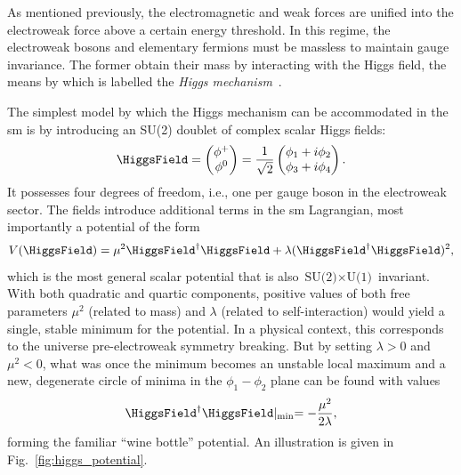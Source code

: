 As mentioned previously, the electromagnetic and weak forces are unified into the electroweak force above a certain energy threshold. In this regime, the electroweak bosons and elementary fermions must be massless to maintain gauge invariance. The former obtain their mass by interacting with the Higgs field, the means by which is labelled the \emph{Higgs mechanism}~\cite{PhysRevLett.13.321,PhysRevLett.13.508,PhysRevLett.13.585}.

The simplest model by which the Higgs mechanism can be accommodated in the \acrshort{sm} is by introducing an SU(2) doublet of complex scalar Higgs fields:
\begin{equation} %
    \HiggsField = \begin{pmatrix} \phi^+ \\ \phi^0 \end{pmatrix} = \frac{1}{\sqrt{2}} \begin{pmatrix} \phi_1 + i\phi_2 \\ \phi_3 + i\phi_4 \end{pmatrix}.
    \label{eq:higgs_field}
\end{equation}
It possesses four degrees of freedom, i.e., one per gauge boson in the electroweak sector. The fields introduce additional terms in the \acrlong{sm} Lagrangian, most importantly a potential of the form
\begin{equation}
    V(\HiggsField) = \mu^2 \HiggsField^{\dagger} \HiggsField + \lambda (\HiggsField^{\dagger} \HiggsField)^2,
    \label{eq:higgs_potential}
\end{equation}
which is the most general scalar potential that is also $\text{SU(2)} \times \text{U(1)}$ invariant. With both quadratic and quartic components, positive values of both free parameters $\mu^2$ (related to mass) and $\lambda$ (related to self-interaction) would yield a single, stable minimum for the potential. In a physical context, this corresponds to the universe pre-electroweak symmetry breaking. But by setting $\lambda > \text{0}$ and $\mu^2 < \text{0}$, what was once the minimum becomes an unstable local maximum and a new, degenerate circle of minima in the $\phi_1 - \phi_2$ plane can be found with values
\begin{equation}
    \HiggsField^{\dagger} \HiggsField \lvert_{\mathrm{min}} = -\frac{\mu^2}{2\lambda},
    \label{eq:higgs_mu_lambda}
\end{equation}
forming the familiar ``wine bottle'' potential. An illustration is given in Fig.~\ref{fig:higgs_potential}.

